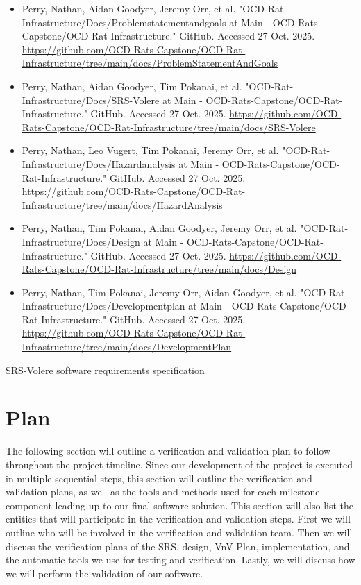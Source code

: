 \documentclass[12pt, titlepage]{article}
\begin{document}
\begin{itemize}
    \item Perry, Nathan, Aidan Goodyer, Jeremy Orr, et al. "OCD-Rat-Infrastructure/Docs/Problemstatementandgoals at Main - OCD-Rats-Capstone/OCD-Rat-Infrastructure." GitHub. Accessed 27 Oct. 2025. \url{https://github.com/OCD-Rats-Capstone/OCD-Rat-Infrastructure/tree/main/docs/ProblemStatementAndGoals}

    \item Perry, Nathan, Aidan Goodyer, Tim Pokanai, et al. "OCD-Rat-Infrastructure/Docs/SRS-Volere at Main - OCD-Rats-Capstone/OCD-Rat-Infrastructure." GitHub. Accessed 27 Oct. 2025. \url{https://github.com/OCD-Rats-Capstone/OCD-Rat-Infrastructure/tree/main/docs/SRS-Volere}

    \item Perry, Nathan, Leo Vugert, Tim Pokanai, Jeremy Orr, et al. "OCD-Rat-Infrastructure/Docs/Hazardanalysis at Main - OCD-Rats-Capstone/OCD-Rat-Infrastructure." GitHub. Accessed 27 Oct. 2025. \url{https://github.com/OCD-Rats-Capstone/OCD-Rat-Infrastructure/tree/main/docs/HazardAnalysis}

    \item Perry, Nathan, Tim Pokanai, Aidan Goodyer, Jeremy Orr, et al. "OCD-Rat-Infrastructure/Docs/Design at Main - OCD-Rats-Capstone/OCD-Rat-Infrastructure." GitHub. Accessed 27 Oct. 2025. \url{https://github.com/OCD-Rats-Capstone/OCD-Rat-Infrastructure/tree/main/docs/Design}

    \item Perry, Nathan, Tim Pokanai, Jeremy Orr, Aidan Goodyer, et al. "OCD-Rat-Infrastructure/Docs/Developmentplan at Main - OCD-Rats-Capstone/OCD-Rat-Infrastructure." GitHub. Accessed 27 Oct. 2025. \url{https://github.com/OCD-Rats-Capstone/OCD-Rat-Infrastructure/tree/main/docs/DevelopmentPlan}
\end{itemize}

SRS-Volere software requirements specification

\section{Plan}

\par{The following section will outline a verification and validation plan to follow throughout the project timeline. 
Since our development of the project is executed in multiple sequential steps, this section will outline the verification and validation 
plans, as well as the tools and methods used for each milestone component leading up to our final software solution. This section will also 
list the entities that will participate in the verification and validation steps. First we will outline who will be involved in the 
verification and validation team. Then we will discuss the verification plans of the SRS, design, VnV Plan, implementation, and 
the automatic tools we use for testing and verification. Lastly, we will discuss how we will perform the validation of our software.}
\end{document}
